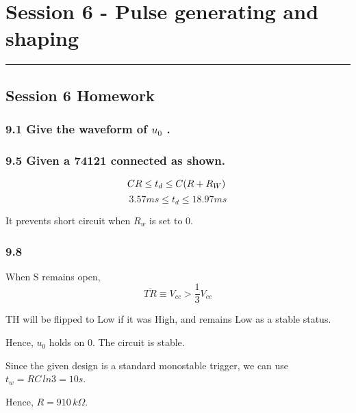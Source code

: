 \section{Session 6 - Pulse generating and shaping}
\vspace{-15pt}\noindent\rule{\textwidth}{0.1pt}\vspace{-10pt}
    \subsection*{Session 6 Homework}
    \subsubsection{9.1 \textnormal{ Give the waveform of $u_0$ }.}
    {\color{hwSolution}

        
        
    }

    \subsubsection{9.5 \textnormal{Given a 74121 connected as shown}.}
    {\color{hwSolution}
        \[
            CR \leq t_d \leq C(R+R_W)~~\\
        \]
        \[
            3.57ms \leq t_d \leq 18.97ms
        \]
    }

    {\color{hwSolution}
    
        It prevents short circuit when $R_w$ is set to 0.
    
    }

    \subsubsection{9.8}
    {\color{hwSolution}

        When S remains open, \[\overline{TR}\equiv V_{cc} > \frac{1}{3}V_{cc}\]

        TH will be flipped to Low if it was High, and remains Low as a stable status.

        Hence, $u_0$ holds on $0$. The circuit is stable.

    }

    {\color{hwSolution}

        Since the given design is a standard monostable trigger, we can use $t_w = RC\,ln3 = 10s$.

        Hence, $R = 910\,k\Omega$.

    }

